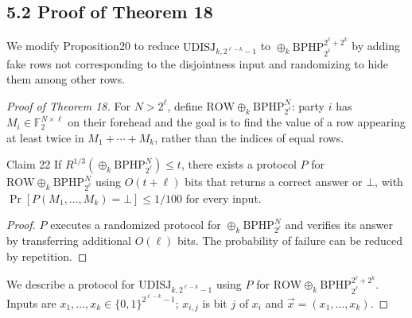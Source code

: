 \subsection*{5.2 Proof of Theorem 18}
We modify Proposition20 to reduce $\mathrm{UDISJ}_{k,2^{\ell-k}-1}$ to $\oplus_k\mathrm{BPHP}_{2^\ell}^{2^\ell+2^k}$ by adding fake rows not corresponding to the disjointness input and randomizing to hide them among other rows.
\begin{proof}[Proof of Theorem 18]
For $N>2^\ell$, define $\mathrm{ROW}\oplus_k\mathrm{BPHP}_{2^\ell}^N$: party $i$ has $M_i\in\mathbb F_2^{N\times\ell}$ on their forehead and the goal is to find the value of a row appearing at least twice in $M_1+\cdots+M_k$, rather than the indices of equal rows.
\begin{authorclaim}{Claim 22}
If $R^{1/3}(\oplus_k\mathrm{BPHP}_{2^\ell}^N)\le t$, there exists a protocol $P$ for $\mathrm{ROW}\oplus_k\mathrm{BPHP}_{2^\ell}^N$ using $O(t+\ell)$ bits that returns a correct answer or $\bot$, with $\Pr[P(M_1,\ldots,M_k)=\bot]\le1/100$ for every input.
\end{authorclaim}
\begin{proof}
$P$ executes a randomized protocol for $\oplus_k\mathrm{BPHP}_{2^\ell}^N$ and verifies its answer by transferring additional $O(\ell)$ bits. The probability of failure can be reduced by repetition.
\end{proof}
We describe a protocol for $\mathrm{UDISJ}_{k,2^{\ell-k}-1}$ using $P$ for $\mathrm{ROW}\oplus_k\mathrm{BPHP}_{2^\ell}^{2^\ell+2^k}$. Inputs are $x_1,\ldots,x_k\in\{0,1\}^{2^{\ell-k}-1}$; $x_{i,j}$ is bit $j$ of $x_i$ and $\vec x=(x_1,\ldots,x_k)$.

\end{proof}
